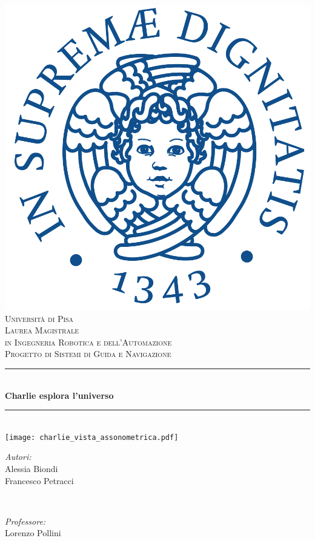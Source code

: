 \begin{titlepage}
	\centering
	\vspace*{0.0 cm}
	\includegraphics[height=.2\textheight]{figs/cherubino_pant541.pdf}\\[0.5 cm]			%
	\textsc{\Large Universit\`a di Pisa }\\[0.5 cm]							%
	\textsc{\large Laurea Magistrale \\ 
		\vspace{2mm} in Ingegneria Robotica e dell'Automazione}\\[0.5 cm]
	\textsc{Progetto di Sistemi di Guida e Navigazione}\\[0.25 cm]	
	
	\rule{\linewidth}{0.2 mm} \\[0.4 cm]
	{ \Large{\textbf{Charlie esplora l'universo}}}\\
	\rule{\linewidth}{0.2 mm} \\[0.5 cm]
	
    
	\texttt{[image: charlie\_vista\_assonometrica.pdf]}	
	\vspace{2 cm}
	\begin{minipage}{0.48\textwidth}
		\begin{flushleft}
			\textit{Autori:}\\
			Alessia Biondi\\
			Francesco Petracci
			
			
		\end{flushleft}
	\end{minipage}~
	\begin{minipage}{0.48\textwidth}
		\begin{flushright}    
			\textit{Professore:}\\		
			Lorenzo Pollini\\
		\end{flushright}
	\end{minipage}\\[2 cm]

	
\end{titlepage}
\newpage